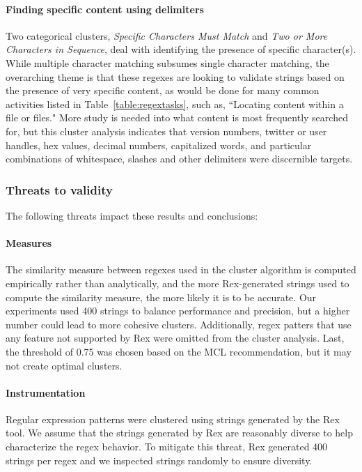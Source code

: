 \paragraph{Finding specific content using delimiters}  Two categorical clusters, \emph{Specific Characters Must Match} and \emph{Two or More Characters in Sequence}, deal with identifying the presence of specific character(s).  While multiple character matching subsumes single character matching, the overarching theme is that these regexes are looking to validate strings based on the presence of very specific content, as would be done for many common activities listed in Table~\ref{table:regextasks}, such as, ``Locating content within a file or files."  More study is needed into what content is most frequently searched for, but this cluster analysis indicates that version numbers, twitter or user handles, hex values, decimal numbers, capitalized words, and particular combinations of whitespace, slashes and other delimiters were discernible targets.

\subsubsection{Threats to validity}
The following threats impact these results and conclusions:

\paragraph{Measures}  The similarity measure between regexes used in the cluster algorithm is computed empirically rather than analytically, and the more Rex-generated strings used to compute the similarity measure, the more likely it is to be accurate. Our experiments used 400 strings to balance performance and precision, but a higher number could lead to more cohesive clusters. Additionally, regex patters that use any feature not supported by Rex were omitted from the cluster analysis. Last, the threshold of 0.75 was chosen based on the MCL recommendation, but it may not create optimal clusters.

\paragraph{Instrumentation} Regular expression patterns were clustered using strings generated by the Rex tool. We assume that the strings generated by Rex are reasonably diverse to help characterize the regex behavior. To mitigate this threat, Rex generated 400 strings per regex and we inspected strings randomly to ensure diversity.

